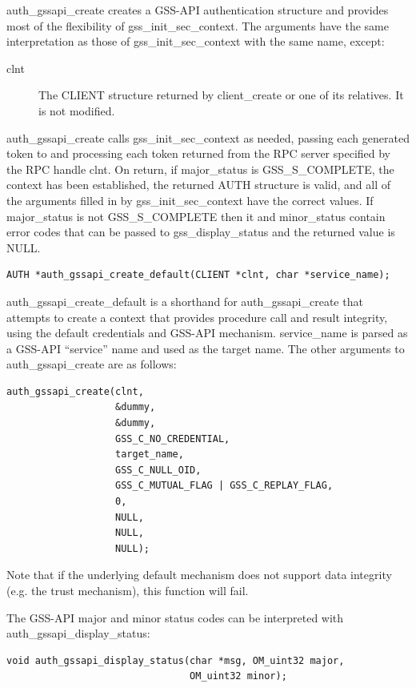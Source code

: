 auth_gssapi_create creates a GSS-API authentication structure and
provides most of the flexibility of gss_init_sec_context.  The
arguments have the same interpretation as those of
gss_init_sec_context with the same name, except:

\begin{description}
\item[clnt] The CLIENT structure returned by client_create or one of
its relatives.  It is not modified.
\end{description}

auth_gssapi_create calls gss_init_sec_context as needed, passing each
generated token to and processing each token returned from the RPC
server specified by the RPC handle clnt.  On return, if major_status
is GSS_S_COMPLETE, the context has been established, the returned AUTH
structure is valid, and all of the arguments filled in by
gss_init_sec_context have the correct values.  If major_status is not
GSS_S_COMPLETE then it and minor_status contain error codes that can
be passed to gss_display_status and the returned value is NULL.

\begin{verbatim}
AUTH *auth_gssapi_create_default(CLIENT *clnt, char *service_name);
\end{verbatim}

auth_gssapi_create_default is a shorthand for auth_gssapi_create that
attempts to create a context that provides procedure call and result
integrity, using the default credentials and GSS-API mechanism.
service_name is parsed as a GSS-API ``service'' name and used as the
target name.  The other arguments to auth_gssapi_create are as follows:

\begin{verbatim}
auth_gssapi_create(clnt,
                   &dummy,
                   &dummy,
                   GSS_C_NO_CREDENTIAL,
                   target_name,
                   GSS_C_NULL_OID,
                   GSS_C_MUTUAL_FLAG | GSS_C_REPLAY_FLAG,
                   0,
                   NULL,
                   NULL,
                   NULL);
\end{verbatim}

Note that if the underlying default mechanism does not support data
integrity (e.g. the trust mechanism), this function will fail.

The GSS-API major and minor status codes can be interpreted with
auth_gssapi_display_status:

\begin{verbatim}
void auth_gssapi_display_status(char *msg, OM_uint32 major,
                                OM_uint32 minor);
\end{verbatim}

